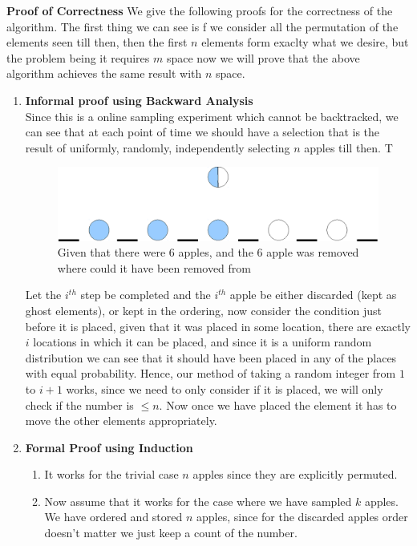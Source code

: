\documentclass{assignment}
\begin{document}
\begin{problemlist}
\begin{problem}
\begin{answer}
\textbf{Proof of Correctness}
We give the following proofs for the correctness of the algorithm. The first thing we can see is f we consider all the permutation of the elements seen till then, then the first $n$ elements form exaclty what we desire, but the problem being it requires $m$ space now we will prove that the above algorithm achieves the same result with $n$ space. 
\begin{enumerate}
 \item \textbf{Informal proof using Backward Analysis} \\
 Since this is a online sampling experiment which cannot be backtracked, we can see that at each point of time we should have a selection that is the result of uniformly, randomly, independently selecting $n$ apples till then. T \\
\begin{figure}[H]
 \centering
 \includegraphics[scale=0.7]{osremove.eps}
 \caption{Given that there were 6 apples, and the 6 apple was removed where could it have been removed from}
 \label{fig:osremove}
\end{figure}
 Let the $i^{th}$ step be completed and the $i^{th}$ apple be either discarded (kept as ghost elements), or kept in the ordering, now consider the condition just before it is placed, given that it was placed in some location, there are exactly $i$ locations in which it can be placed, and since it is a uniform random distribution we can see that it should have been placed in any of the places with equal probability. Hence, our method of taking a random integer from $1$ to $i+1$ works, since we need to only consider if it is placed, we will only check if the number is $\leq n$. Now once we have placed the element it has to move the other elements appropriately. 
\item \textbf{Formal Proof using Induction} \\
 \begin{enumerate}
  \item It works for the trivial case $n$ apples since they are explicitly permuted. 
  \item Now assume that it works for the case where we have sampled $k$ apples. We have ordered and stored $n$ apples, since for the discarded apples order doesn't matter we just keep a count of the number.

\end{enumerate}
\end{enumerate}
\end{answer}
\end{problem}
\end{problemlist}
\end{document}
